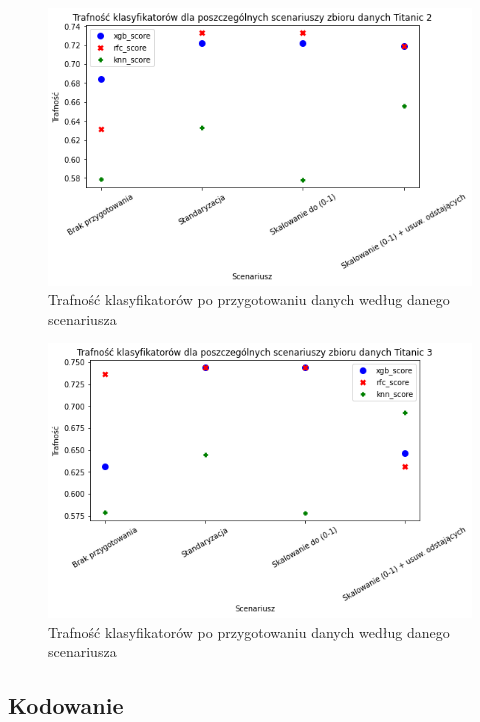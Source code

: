 \documentclass{book}
\begin{document}
\begin{figure}[H]
\centerline{\includegraphics[scale=0.5]{Titanic_2_Standaryzacja}}
\centering
\caption{Trafność klasyfikatorów po przygotowaniu danych 
według danego scenariusza}
\end{figure}

\begin{figure}[H]
\centerline{\includegraphics[scale=0.5]{Titanic_3_Standaryzacja}}
\centering
\caption{Trafność klasyfikatorów po przygotowaniu danych 
według danego scenariusza}
\end{figure}

\subsection{Kodowanie}
\end{document}
